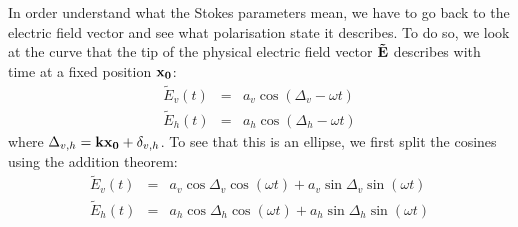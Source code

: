 In order understand what the Stokes parameters mean, we have to go
back to the electric field vector and see what polarisation state it
describes.  To do so, we look at the curve that the tip of the
physical electric field vector $\mathbf{\tilde{E}}$ describes with
time at a fixed position $\mathbf{x_0}$:
\begin{eqnarray}
  \tilde{E}_v (t) &=& a_v \cos(\Delta_v - \omega t)\\
  \tilde{E}_h (t) &=& a_h \cos(\Delta_h - \omega t)
\end{eqnarray}
where $\Delta_{v,h} = \mathbf{k}\mathbf{x_0} + \delta_{v,h}$. 
To see that this is an ellipse, we first split the cosines using
the addition theorem:
\begin{eqnarray}
  \label{eq:polarization:tip_of_fieldvec1}
  \tilde{E}_v (t) &=&   a_v \cos\Delta_v \cos(\omega t)
                      + a_v \sin\Delta_v \sin(\omega t)\\
  \label{eq:polarization:tip_of_fieldvec2}
  \tilde{E}_h (t) &=&   a_h \cos\Delta_h \cos(\omega t)
                      + a_h \sin\Delta_h \sin(\omega t)
\end{eqnarray}

